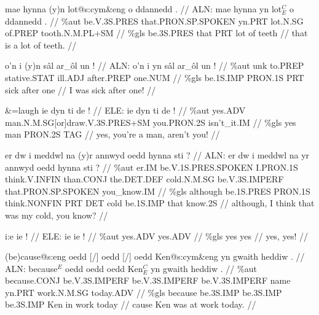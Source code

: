\documentclass[a4paper,10pt]{article}
\begin{document}
\ex
\begingl[lingstyle=gergl]
\glchat mae hynna (y)n lot@s:cym\&eng o ddannedd . //
\glsurface ALN:  mae hynna yn lot$^{C}_{E}$ o ddannedd .  //
\glauto \%aut  be{\scriptsize .V.3S.PRES} that{\scriptsize .PRON.SP.SPOKEN} yn{\scriptsize .PRT} lot{\scriptsize .N.SG} of{\scriptsize .PREP} tooth{\scriptsize .N.M.PL+SM}   //
\glmanual \%gls  be{\scriptsize .3S.PRES} that PRT lot of teeth   //
\gleng that is a lot of teeth. //
\endgl
\xe

\ex
\begingl[lingstyle=gergl]
\glchat o'n i (y)n sâl ar\_ôl un ! //
\glsurface ALN:  o'n i yn sâl ar\_ôl un !  //
\glauto \%aut  unk to{\scriptsize .PREP} stative{\scriptsize .STAT} ill{\scriptsize .ADJ} after{\scriptsize .PREP} one{\scriptsize .NUM}   //
\glmanual \%gls  be{\scriptsize .1S.IMP} PRON{\scriptsize .1S} PRT sick after one   //
\gleng I was sick after one! //
\endgl
\xe

\ex
\begingl[lingstyle=gergl]
\glchat \&=laugh ie dyn ti de ! //
\glsurface ELE:  ie dyn ti de !  //
\glauto \%aut  yes{\scriptsize .ADV} man{\scriptsize .N.M.SG[or]draw.V.3S.PRES+SM} you{\scriptsize .PRON.2S} isn't\_it{\scriptsize .IM}   //
\glmanual \%gls  yes man PRON{\scriptsize .2S} TAG   //
\gleng yes, you're a man, aren't you! //
\endgl
\xe

\ex
\begingl[lingstyle=gergl]
\glchat er dw i meddwl na (y)r annwyd oedd hynna sti ? //
\glsurface ALN:  er dw i meddwl na yr annwyd oedd hynna sti ?  //
\glauto \%aut  er{\scriptsize .IM} be{\scriptsize .V.1S.PRES.SPOKEN} I{\scriptsize .PRON.1S} think{\scriptsize .V.INFIN} than{\scriptsize .CONJ} the{\scriptsize .DET.DEF} cold{\scriptsize .N.M.SG} be{\scriptsize .V.3S.IMPERF} that{\scriptsize .PRON.SP.SPOKEN} you\_know{\scriptsize .IM}   //
\glmanual \%gls  although be{\scriptsize .1S.PRES} PRON{\scriptsize .1S} think{\scriptsize .NONFIN} PRT DET cold be{\scriptsize .1S.IMP} that know{\scriptsize .2S}   //
\gleng although, I think that was my cold, you know? //
\endgl
\xe

\ex
\begingl[lingstyle=gergl]
\glchat i:e ie ! //
\glsurface ELE:  ie ie !  //
\glauto \%aut  yes{\scriptsize .ADV} yes{\scriptsize .ADV}   //
\glmanual \%gls  yes yes   //
\gleng yes, yes! //
\endgl
\xe

\ex
\begingl[lingstyle=gergl]
\glchat (be)cause@s:eng oedd [/] oedd [/] oedd Ken@s:cym\&eng yn gwaith heddiw . //
\glsurface ALN:  because$^{E}$ oedd oedd oedd Ken$^{C}_{E}$ yn gwaith heddiw .  //
\glauto \%aut  because{\scriptsize .CONJ} be{\scriptsize .V.3S.IMPERF} be{\scriptsize .V.3S.IMPERF} be{\scriptsize .V.3S.IMPERF} name yn{\scriptsize .PRT} work{\scriptsize .N.M.SG} today{\scriptsize .ADV}   //
\glmanual \%gls  because be{\scriptsize .3S.IMP} be{\scriptsize .3S.IMP} be{\scriptsize .3S.IMP} Ken in work today   //
\gleng cause Ken was at work today. //
\endgl
\xe
\end{document}
